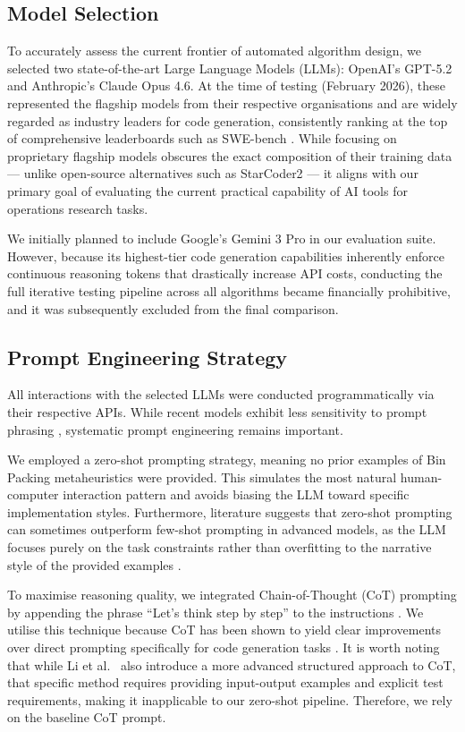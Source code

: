 \documentclass[11pt]{article}
\begin{document}
\subsection{Model Selection}
To accurately assess the current frontier of automated algorithm design, 
we selected two state-of-the-art Large Language Models (LLMs): OpenAI's 
GPT-5.2 and Anthropic's Claude Opus 4.6. At the time of testing (February 
2026), these represented the flagship models from their respective 
organisations and are widely regarded as industry leaders for code 
generation, consistently ranking at the top of comprehensive leaderboards 
such as SWE-bench \cite{swebench}. While focusing on proprietary flagship 
models obscures the exact composition of their training data --- unlike 
open-source alternatives such as StarCoder2 \cite{starcoder2} --- it 
aligns with our primary goal of evaluating the current practical capability 
of AI tools for operations research tasks.

We initially planned to include Google's Gemini 3 Pro in our evaluation 
suite. However, because its highest-tier code generation capabilities 
inherently enforce continuous reasoning tokens that drastically increase 
API costs, conducting the full iterative testing pipeline across all 
algorithms became financially prohibitive, and it was subsequently excluded 
from the final comparison.

\subsection{Prompt Engineering Strategy}
All interactions with the selected LLMs were conducted programmatically 
via their respective APIs. While recent models exhibit less sensitivity to 
prompt phrasing \cite{wangz}, systematic prompt engineering remains 
important.

We employed a zero-shot prompting strategy, meaning no prior examples of 
Bin Packing metaheuristics were provided. This simulates the most natural 
human-computer interaction pattern and avoids biasing the LLM toward 
specific implementation styles. Furthermore, literature suggests that 
zero-shot prompting can sometimes outperform few-shot prompting in advanced 
models, as the LLM focuses purely on the task constraints rather than 
overfitting to the narrative style of the provided examples \cite{reynolds}.

To maximise reasoning quality, we integrated Chain-of-Thought (CoT) 
prompting by appending the phrase ``Let's think step by step'' to the 
instructions \cite{kojima2022}. We utilise this technique because CoT has 
been shown to yield clear improvements over direct prompting specifically 
for code generation tasks \cite{li2024structured}. It is worth noting that 
while Li et al.\ \cite{li2024structured} also introduce a more advanced 
structured approach to CoT, that specific method requires providing 
input-output examples and explicit test requirements, making it 
inapplicable to our zero-shot pipeline. Therefore, we rely on the baseline 
CoT prompt.
\end{document}
